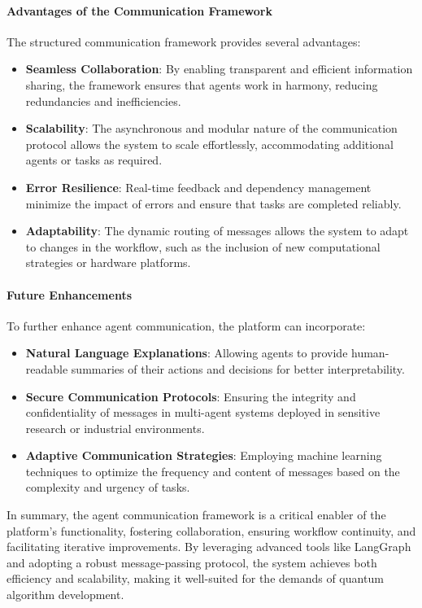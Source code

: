 \documentclass[12pt]{article}
\begin{document}
\paragraph{Advantages of the Communication Framework}
The structured communication framework provides several advantages:
\begin{itemize}
    \item \textbf{Seamless Collaboration}: By enabling transparent and efficient information sharing, the framework ensures that agents work in harmony, reducing redundancies and inefficiencies.
    \item \textbf{Scalability}: The asynchronous and modular nature of the communication protocol allows the system to scale effortlessly, accommodating additional agents or tasks as required.
    \item \textbf{Error Resilience}: Real-time feedback and dependency management minimize the impact of errors and ensure that tasks are completed reliably.
    \item \textbf{Adaptability}: The dynamic routing of messages allows the system to adapt to changes in the workflow, such as the inclusion of new computational strategies or hardware platforms.
\end{itemize}

\paragraph{Future Enhancements}
To further enhance agent communication, the platform can incorporate:
\begin{itemize}
    \item \textbf{Natural Language Explanations}: Allowing agents to provide human-readable summaries of their actions and decisions for better interpretability.
    \item \textbf{Secure Communication Protocols}: Ensuring the integrity and confidentiality of messages in multi-agent systems deployed in sensitive research or industrial environments.
    \item \textbf{Adaptive Communication Strategies}: Employing machine learning techniques to optimize the frequency and content of messages based on the complexity and urgency of tasks.
\end{itemize}

In summary, the agent communication framework is a critical enabler of the platform's functionality, fostering collaboration, ensuring workflow continuity, and facilitating iterative improvements. By leveraging advanced tools like LangGraph and adopting a robust message-passing protocol, the system achieves both efficiency and scalability, making it well-suited for the demands of quantum algorithm development.
\end{document}
